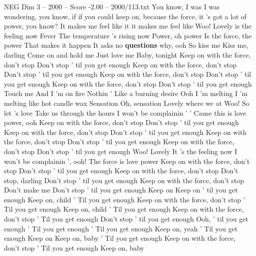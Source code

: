 \begin{textsample}{NEG Dim 3 – 2000 – Score -2.00 – 2000/113.txt}  \label{ex:f3_neg_010}
You know, I was I was wondering, you know, if if you could keep on, because the force, it 's got a lot of power, you know?
It makes me feel like it it makes me feel like Woo!
Lovely is the feeling now Fever The temperature 's rising now Power, oh power Is the force, the power That makes it happen It asks no \textbf{questions} why, ooh So kiss me Kiss me, darling Come on and hold me Just love me Baby, tonight Keep on with the force, don't stop Don't stop ' til you get enough Keep on with the force, don't stop Don't stop ' til you get enough Keep on with the force, don't stop Don't stop ' til you get enough Keep on with the force, don't stop Don't stop ' til you get enough Touch me And I 'm on fire Nothin ' Like a burning desire Ooh I 'm melting I 'm melting like hot candle wax Sensation Oh, sensation Lovely where we at Woo!
So let 's love Take us through the hours I won't be complainin ' ' Cause this is love power, ooh Keep on with the force, don't stop Don't stop ' til you get enough Keep on with the force, don't stop Don't stop ' til you get enough Keep on with the force, don't stop Don't stop ' til you get enough Keep on with the force, don't stop Don't stop ' til you get enough Woo!
Lovely It 's the feeling now I won't be complainin ', ooh!
The force is love power Keep on with the force, don't stop Don't stop ' til you get enough Keep on with the force, don't stop Don't stop, darling Don't stop ' til you get enough Keep on with the force, don't stop Don't make me Don't stop ' til you get enough Keep on Keep on ' til you get enough Keep on, child ' Til you get enough Keep on with the force, don't stop ' Til you get enough Keep on, child ' Til you get enough Keep on with the force, don't stop ' Til you get enough Don't stop ' til you get enough Ooh, ' til you get enough ' Til you get enough ' Til you get enough Keep on, yeah ' Til you get enough Keep on Keep on, baby ' Til you get enough Keep on with the force, don't stop ' Til you get enough Keep on, baby

\end{textsample}
